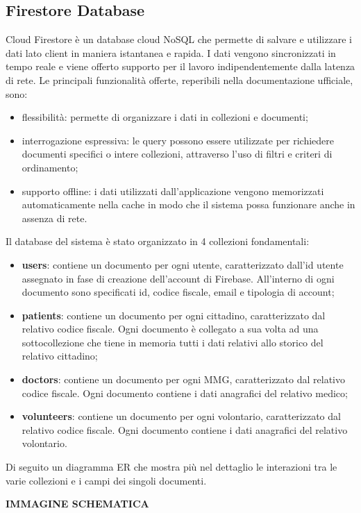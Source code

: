 \documentclass[12pt,a4paper,twoside,openright,titlepage]{book}
\begin{document}
\subsection{Firestore Database}
Cloud Firestore è un database cloud NoSQL che permette di salvare e utilizzare i dati lato client in maniera istantanea e rapida. I dati vengono sincronizzati in tempo reale e viene offerto supporto per il lavoro indipendentemente dalla latenza di rete. Le principali funzionalità offerte, reperibili nella documentazione ufficiale, sono:
\begin{itemize}
\item flessibilità: permette di organizzare i dati in collezioni e documenti;
\item interrogazione espressiva: le query possono essere utilizzate per richiedere documenti specifici o intere collezioni, attraverso l'uso di filtri e criteri di ordinamento;
\item supporto offline: i dati utilizzati dall'applicazione vengono memorizzati automaticamente nella cache in modo che il sistema possa funzionare anche in assenza di rete.
\end{itemize}
Il database del sistema è stato organizzato in 4 collezioni fondamentali:
\begin{itemize}
\item \textbf{users}: contiene un documento per ogni utente, caratterizzato dall'id utente assegnato in fase di creazione dell'account di Firebase. All'interno di ogni documento sono specificati id, codice fiscale, email e tipologia di account;
\item \textbf{patients}: contiene un documento per ogni cittadino, caratterizzato dal relativo codice fiscale. Ogni documento è collegato a sua volta ad una sottocollezione che tiene in memoria tutti i dati relativi allo storico del relativo cittadino;
\item \textbf{doctors}: contiene un documento per ogni MMG, caratterizzato dal relativo codice fiscale. Ogni documento contiene i dati anagrafici del relativo medico;
\item \textbf{volunteers}: contiene un documento per ogni volontario, caratterizzato dal relativo codice fiscale. Ogni documento contiene i dati anagrafici del relativo volontario.
\end{itemize}
Di seguito un diagramma ER che mostra più nel dettaglio le interazioni tra le varie collezioni e i campi dei singoli documenti.\newline

\textbf{IMMAGINE SCHEMATICA}
\end{document}
